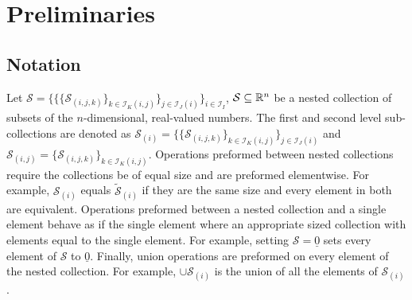 \section{Preliminaries}
\subsection{Notation}
Let $\mathcal{S}=\{\{\{\mathcal{S}_{(i,j,k)}\}_{k\in\mathcal{I}_{K}(i,j)}\}_{j\in\mathcal{I}_{J}(i)}\}_{i\in\mathcal{I}_I}$, $\mathcal{S}\subseteq\mathbb{R}^n$ be a nested collection of subsets of the $n$-dimensional, real-valued numbers. The first and second level sub-collections are denoted as $\mathcal{S}_{(i)}=\{\{\mathcal{S}_{(i,j,k)}\}_{k\in\mathcal{I}_{K}(i,j)}\}_{j\in\mathcal{I}_{J}(i)}$ and $\mathcal{S}_{(i,j)}=\{\mathcal{S}_{(i,j,k)}\}_{k\in\mathcal{I}_{K}(i,j)}$. Operations preformed between nested collections require the collections be of equal size and are preformed elementwise. For example, $\mathcal{S}_{(i)}$ equals $\tilde{\mathcal{S}}_{(i)}$ if they are the same size and every element in both are equivalent. Operations preformed between a nested collection and a single element behave as if the single element where an appropriate sized collection with elements equal to the single element. For example, setting $\mathcal{S}=\underline{0}$ sets every element of $\mathcal{S}$ to $\underline{0}$. Finally, union operations are preformed on every element of the nested collection. For example, $\cup \mathcal{S}_{(i)}$ is the union of all the elements of $\mathcal{S}_{(i)}$.

